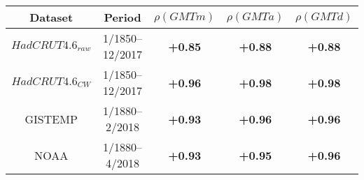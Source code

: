 \begin{tabular}{ccccc}
 Dataset & Period & $\rho(GMTm)$ & $\rho(GMTa)$ & $\rho(GMTd)$ \\
\hline
$HadCRUT4.6_{raw}$ &1/1850--12/2017 &\textbf{+0.85} &\textbf{+0.88} &\textbf{+0.88}\\
$HadCRUT4.6_{CW}$ &1/1850--12/2017 &\textbf{+0.96} &\textbf{+0.98} &\textbf{+0.98}\\
GISTEMP &1/1880--2/2018 &\textbf{+0.93} &\textbf{+0.96} &\textbf{+0.96}\\
NOAA &1/1880--4/2018 &\textbf{+0.93} &\textbf{+0.95} &\textbf{+0.96}\\
\end{tabular}
